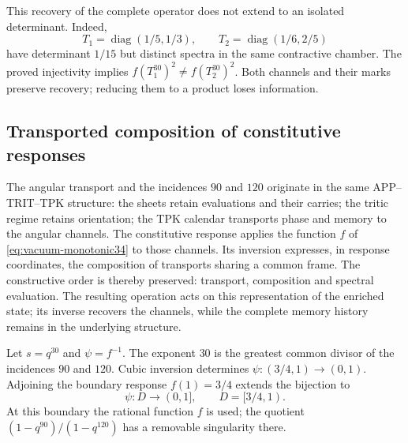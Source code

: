 This recovery of the complete operator does not extend to an isolated determinant. Indeed,
\[
 T_1=\operatorname{diag}(1/5,1/3),\qquad
 T_2=\operatorname{diag}(1/6,2/5)
\]
have determinant \(1/15\) but distinct spectra in the same contractive chamber. The proved injectivity implies \(f(T_1^{30})^2\ne f(T_2^{30})^2\). Both channels and their marks preserve recovery; reducing them to a product loses information.

\subsection{Transported composition of constitutive responses}
\label{cr28:comp-sec}

The angular transport and the incidences $90$ and $120$ originate in the
same APP--TRIT--TPK structure: the sheets retain evaluations and their
carries; the tritic regime retains orientation; the TPK calendar transports
phase and memory to the angular channels. The constitutive response
applies the function $f$ of \eqref{eq:vacuum-monotonic34} to those channels.
Its inversion expresses, in response coordinates, the composition of
transports sharing a common frame. The constructive order is thereby
preserved: transport, composition and spectral evaluation. The resulting
operation acts on this representation of the enriched state; its inverse
recovers the channels, while the complete memory history remains in the
underlying structure.

Let $s=q^{30}$ and $\psi=f^{-1}$. The exponent $30$ is the greatest
common divisor of the incidences $90$ and $120$. Cubic inversion determines
$\psi:(3/4,1)\longrightarrow(0,1)$. Adjoining the boundary response
$f(1)=3/4$ extends the bijection to
\[
 \psi:D\longrightarrow(0,1],\qquad D=[3/4,1).
\]
At this boundary the rational function $f$ is used; the quotient
$(1-q^{90})/(1-q^{120})$ has a removable singularity there.

